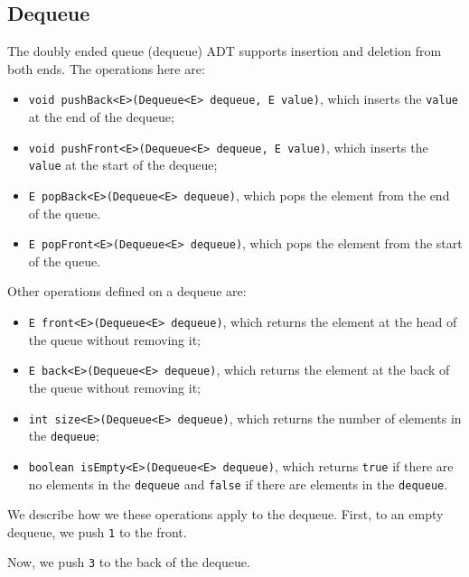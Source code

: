 \documentclass[a4paper, openany]{memoir}
\begin{document}
\subsection{Dequeue}
The doubly ended queue (dequeue) ADT supports insertion and deletion from both ends. The operations here are:
\begin{itemize}
    \item \texttt{void pushBack<E>(Dequeue<E> dequeue, E value)}, which inserts the \texttt{value} at the end of the dequeue;
    \item \texttt{void pushFront<E>(Dequeue<E> dequeue, E value)}, which inserts the \texttt{value} at the start of the dequeue;
    \item \texttt{E popBack<E>(Dequeue<E> dequeue)}, which pops the element from the end of the queue.
    \item \texttt{E popFront<E>(Dequeue<E> dequeue)}, which pops the element from the start of the queue.
\end{itemize}
Other operations defined on a dequeue are:
\begin{itemize}
    \item \texttt{E front<E>(Dequeue<E> dequeue)}, which returns the element at the head of the queue without removing it;
    \item \texttt{E back<E>(Dequeue<E> dequeue)}, which returns the element at the back of the queue without removing it;
    \item \texttt{int size<E>(Dequeue<E> dequeue)}, which returns the number of elements in the \texttt{dequeue};
    \item \texttt{boolean isEmpty<E>(Dequeue<E> dequeue)}, which returns \texttt{true} if there are no elements in the \texttt{dequeue} and \texttt{false} if there are elements in the \texttt{dequeue}.
\end{itemize}
We describe how we these operations apply to the dequeue. First, to an empty dequeue, we push \texttt{1} to the front.
\begin{center}
\end{center}
Now, we push \texttt{3} to the back of the dequeue.
\begin{center}
\end{center}
\end{document}
